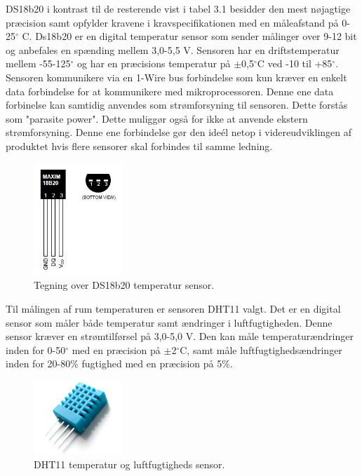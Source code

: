 DS18b20 i kontrast til de resterende vist i tabel 3.1 besidder den mest nøjagtige præcision samt opfylder kravene i kravspecifikationen med en måleafstand på 0-25$^{\circ}$ C. \newline
Ds18b20 er en digital temperatur sensor som sender målinger over 9-12 bit og anbefales en spænding mellem 3,0-5,5 V. \newline
Sensoren har en driftstemperatur mellem -55-125$^{\circ}$ og har en præcisions temperatur på $\pm$0,5$^{\circ}$C ved -10 til +85$^{\circ}$. Sensoren kommunikere via en 1-Wire bus forbindelse som kun kræver en enkelt data forbindelse for at kommunikere med mikroprocessoren. Denne ene data forbinelse kan samtidig anvendes som strømforsyning til sensoren. Dette forstås som "parasite power". Dette muliggør også for ikke at anvende ekstern strømforsyning. 
Denne ene forbindelse gør den ideél netop i videreudviklingen af produktet hvis flere sensorer skal forbindes til samme ledning.

\begin{figure}[h!]
  \centering
  \includegraphics[width=0.3\textwidth]{figures/ds18b20-pinout.jpg}
  \caption{Tegning over DS18b20 temperatur sensor.}
  \label{ds18b20_pins}
\end{figure} 

Til målingen af rum temperaturen er sensoren DHT11 valgt. Det er en digital sensor som måler både temperatur samt ændringer i luftfugtigheden. Denne sensor kræver en strømtilførsel på 3,0-5,0 V. \newline
Den kan måle temperaturændringer inden for 0-50$^{\circ}$ med en præcision på $\pm$2$^{\circ}$C, samt måle luftfugtighedsændringer inden for 20-80\% fugtighed med en præcision på 5\%. 

\begin{figure}[h!]
  \centering
  \includegraphics[width=0.3\textwidth]{figures/DHT11.jpg}
  \caption{DHT11 temperatur og luftfugtigheds sensor.}
  \label{dht11_billede}
\end{figure} 
   






\newpage
